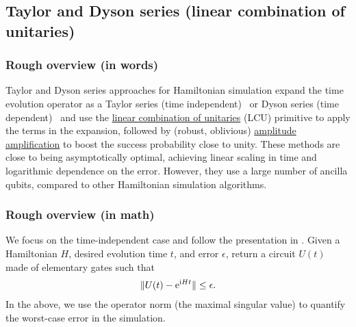 \newpage

\begin{refsection}




\subsection{Taylor and Dyson series (linear combination of unitaries)}
\label{prim:TaylorDyson}
\subsubsection*{Rough overview (in words)}
Taylor and Dyson series approaches for Hamiltonian simulation expand the time evolution operator as a Taylor series (time independent)~\cite{berry2014HamSimTaylor} or Dyson series (time dependent)~\cite{kieferova2019DysonSeriesSimulation,berry2019TimeDependentHamSimL1} and use the \hyperref[prim:LCU]{ linear combination of unitaries} (LCU) primitive to apply the terms in the expansion, followed by (robust, oblivious) \hyperref[prim:AA]{amplitude amplification} to boost the success probability close to unity. These methods are close to being asymptotically optimal, achieving linear scaling in time and logarithmic dependence on the error. However, they use a large number of ancilla qubits, compared to other Hamiltonian simulation algorithms. 




\subsubsection*{Rough overview (in math)}

We focus on the time-independent case and follow the presentation in \cite{berry2014HamSimTaylor}. Given a Hamiltonian $H$, desired evolution time $t$, and error $\epsilon$, return a circuit $U(t)$ made of elementary gates such that
\begin{align}
    \lVert U(t) - \mathrm{e}^{\mathrm{i} H t} \rVert \le \epsilon.
\end{align}
In the above, we use the operator norm (the maximal singular value) to quantify the worst-case error in the simulation.


\end{refsection}

